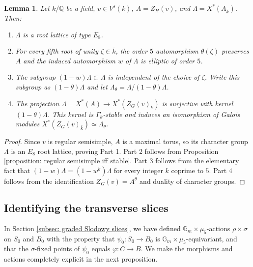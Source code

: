 \documentclass{article} %
\newtheorem{lemma}[proposition]{Lemma}
\numberwithin{equation}{section}
\theoremstyle{definition}
\newcommand{\G}{\mathbb{G}}
\newcommand{\Q}{\mathbb{Q}}
\begin{document}
\begin{lemma}\label{lemma:5gradingstable elements give root lattice}
    Let $k/\Q$ be a field, $v\in V^s(k)$, $A = Z_H(v)$, and $\Lambda = X^*(A_{\bar{k}})$. 
    Then:
    \begin{enumerate}
        \item $\Lambda$ is a root lattice of type $E_8$.
        \item For every fifth root of unity $\zeta\in \bar{k}$, the order $5$ automorphism $\theta(\zeta)$ preserves $A$ and the induced automorphism $w$ of $\Lambda$ is elliptic of order $5$. 
        \item The subgroup $(1-w)\Lambda\subset \Lambda$ is independent of the choice of $\zeta$. Write this subgroup as $(1-\theta)\Lambda$ and let $\Lambda_{\theta} = \Lambda/(1-\theta)\Lambda$.
        \item The projection $\Lambda = X^*(A) \rightarrow X^*(Z_G(v)_{\bar{k}})$ is surjective with kernel $(1-\theta)\Lambda$.
        This kernel is $\Gamma_k$-stable and induces an isomorphism of Galois modules $X^*(Z_G(v)_{\bar{k}})\simeq \Lambda_{\theta}$.
    \end{enumerate}
\end{lemma}
\begin{proof}
    Since $v$ is regular semisimple, $A$ is a maximal torus, so its character group $\Lambda$ is an $E_8$ root lattice, proving Part 1.
    Part 2 follows from Proposition \ref{proposition: regular semisimple iff stable}.
    Part 3 follows from the elementary fact that $(1-w)\Lambda = (1-w^k)\Lambda$ for every integer $k$ coprime to $5$.
    Part 4 follows from the identification $Z_G(v) = A^{\theta}$ and duality of character groups.
\end{proof}




\subsection{Identifying the transverse slices}\label{subsec:5gradingtransverseslice}




In Section \ref{subsec: graded Slodowy slices}, we have defined $\G_m\times \mu_5$-actions $\rho\times \sigma$ on $S_0$ and $B_0$ with the property that $\psi_0\colon S_0\rightarrow B_0$ is $\G_m\times\mu_5$-equivariant, and that the $\sigma$-fixed points of $\psi_0$ equals $\varphi\colon C\rightarrow B$.
We make the morphisms and actions completely explicit in the next proposition.
\end{document}
